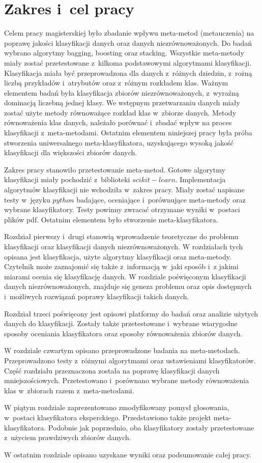 \chapter*{Zakres i~cel pracy}
Celem pracy magisterskiej było zbadanie wpływu meta-metod (metauczenia) na poprawę jakości klasyfikacji danych oraz danych niezrównoważonych. Do badań wybrano algorytmy bagging, boosting oraz stacking. Wszystkie meta-metody miały zostać przetestowane z~kilkoma podstawowymi algorytmami klasyfikacji. Klasyfikacja miała być przeprowadzona dla danych z~różnych dziedzin, z~rożną liczbą przykładów i~atrybutów oraz z~różnym rozkładem klas. Ważnym elementem badań była klasyfikacja zbiorów niezrównoważonych, z~wyraźną dominacją liczebną jednej klasy. We wstępnym przetwarzaniu danych miały zostać użyte metody równoważące rozkład klas w~zbiorze danych. Metody równoważenia klas danych, należało porównać i~zbadać wpływ na proces klasyfikacji z~meta-metodami. Ostatnim elementem niniejszej pracy była próba stworzenia uniwersalnego meta-klasyfikatora, uzyskującego wysoką jakość klasyfikacji dla większości zbiorów danych. \par
Zakres pracy stanowiło przetestowanie meta-metod. Gotowe algorytmy klasyfikacji miały pochodzić z~biblioteki $scikit-learn$. Implementacja algorytmów klasyfikacji nie wchodziła w~zakres pracy. Miały zostać napisane testy w~języku $python$ badające, oceniające i~porównujące meta-metody oraz wybrane klasyfikatory. Testy powinny zwracać otrzymane wyniki w~postaci plików pdf. Ostatnim elementem było stworzenie meta-klasyfikatora. \par
Rozdział pierwszy i~drugi stanowią wprowadzenie teoretyczne do problemu klasyfikacji oraz klasyfikacji danych niezrównoważonych. W rozdziałach tych opisana jest klasyfikacja, użyte algorytmy klasyfikacji oraz meta-metody. Czytelnik może zaznajomić się także z~informacją w~jaki sposób i~z jakimi miarami ocenia się klasyfikację danych. W rozdziale poświęconym klasyfikacji danych niezrównoważonych, znajduje się geneza problemu oraz opis dostępnych i~możliwych rozwiązań poprawy klasyfikacji takich danych. \par
Rozdział trzeci poświęcony jest opisowi platformy do badań oraz analizie użytych danych do klasyfikacji. Zostały także przetestowane i~wybrane wiarygodne sposoby oceniania klasyfikatora oraz sposoby równoważenia zbiorów danych. \par
W rozdziale czwartym opisano przeprowadzone badania na meta-metodach. Przeprowadzono testy z~różnymi algorytmami oraz ustawieniami klasyfikatorów. Część rozdziału przeznaczona została na poprawę klasyfikacji danych mniejszościowych. Przetestowano i~porównano wybrane metody równoważenia klas w~zbiorach razem z~meta-metodami. \par
W piątym rozdziale zaprezentowano zmodyfikowany pomysł głosowania, w~postaci klasyfikatora eksperckiego. Przedstawiono także projekt meta-klasyfikatora. Podobnie jak poprzednio, oba klasyfikatory zostały przetestowane z~użyciem prawdziwych zbiorów danych. \par
W ostatnim rozdziale opisano uzyskane wyniki oraz podsumowanie całej pracy.